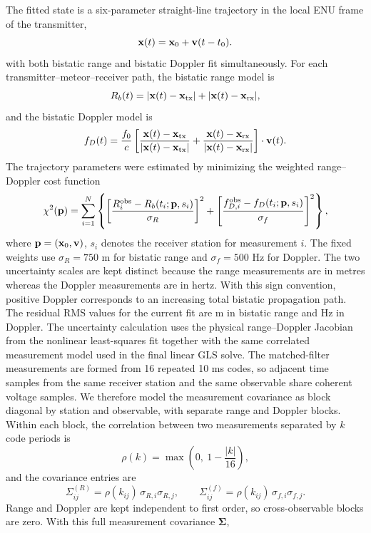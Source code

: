 The fitted state is a six-parameter straight-line trajectory in the local ENU
frame of the transmitter,
\[
  {\bf x}(t) = {\bf x}_0 + {\bf v}(t-t_0).
\]
with both bistatic range and bistatic Doppler fit simultaneously.  For each
transmitter--meteor--receiver path, the bistatic range model is
\[
  R_b(t)=|{\bf x}(t)-{\bf x}_{\mathrm{tx}}|
             +|{\bf x}(t)-{\bf x}_{\mathrm{rx}}|,
\]
and the bistatic Doppler model is
\[
  f_D(t)=\frac{f_0}{c}
  \left[
    \frac{{\bf x}(t)-{\bf x}_{\mathrm{tx}}}
         {|{\bf x}(t)-{\bf x}_{\mathrm{tx}}|}
    +
    \frac{{\bf x}(t)-{\bf x}_{\mathrm{rx}}}
         {|{\bf x}(t)-{\bf x}_{\mathrm{rx}}|}
  \right]\cdot{\bf v}(t).
\]
The trajectory parameters were estimated by minimizing the weighted
range--Doppler cost function
\[
  \chi^2({\bf p}) =
  \sum_{i=1}^{N}
  \left\{
  \left[
    \frac{R_i^{\mathrm{obs}}-R_b(t_i;{\bf p},s_i)}
         {\sigma_R}
  \right]^2
  +
  \left[
    \frac{f_{D,i}^{\mathrm{obs}}-f_D(t_i;{\bf p},s_i)}
         {\sigma_f}
  \right]^2
  \right\},
\]
where \({\bf p}=({\bf x}_0,{\bf v})\), \(s_i\) denotes the receiver station
for measurement \(i\).  The fixed weights use \(\sigma_R=750\) m for bistatic
range and \(\sigma_f=500\) Hz for Doppler.  The two uncertainty scales are
kept distinct because the range measurements are in metres whereas the Doppler
measurements are in hertz.
With this sign convention, positive Doppler corresponds to an increasing total
bistatic propagation path.
The residual RMS values for the current fit are \TrajectoryRangeRmsM{} m in
bistatic range and \TrajectoryDopplerRmsHz{} Hz in Doppler.
The uncertainty calculation uses the physical range--Doppler Jacobian from the
nonlinear least-squares fit together with the same correlated measurement model
used in the final linear GLS solve.  The matched-filter measurements are formed
from 16 repeated 10 ms codes, so adjacent time samples from the same receiver
station and the same observable share coherent voltage samples.  We therefore
model the measurement covariance as block diagonal by station and observable,
with separate range and Doppler blocks.  Within each block, the correlation
between two measurements separated by \(k\) code periods is
\[
  \rho(k) = \max\left(0,\ 1-\frac{|k|}{16}\right),
\]
and the covariance entries are
\[
  \Sigma^{(R)}_{ij} = \rho(k_{ij})\,\sigma_{R,i}\sigma_{R,j},
  \qquad
  \Sigma^{(f)}_{ij} = \rho(k_{ij})\,\sigma_{f,i}\sigma_{f,j}.
\]
Range and Doppler are kept independent to first order, so cross-observable
blocks are zero.  With this full measurement covariance \(\boldsymbol{\Sigma}\),
